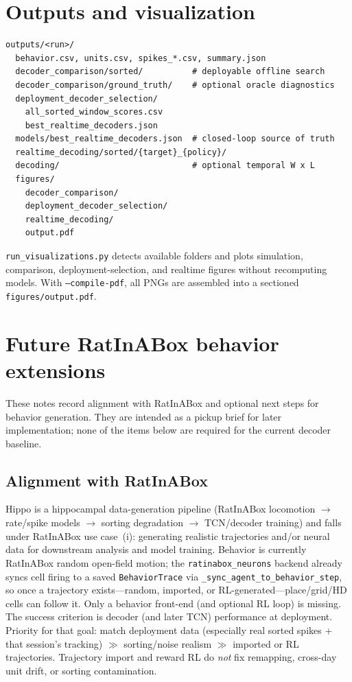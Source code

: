 \documentclass[11pt,a4paper]{article}
\begin{document}
\section{Outputs and visualization}

\begin{lstlisting}[caption={Experiment directory layout.}]
outputs/<run>/
  behavior.csv, units.csv, spikes_*.csv, summary.json
  decoder_comparison/sorted/          # deployable offline search
  decoder_comparison/ground_truth/    # optional oracle diagnostics
  deployment_decoder_selection/
    all_sorted_window_scores.csv
    best_realtime_decoders.json
  models/best_realtime_decoders.json  # closed-loop source of truth
  realtime_decoding/sorted/{target}_{policy}/
  decoding/                           # optional temporal W x L
  figures/
    decoder_comparison/
    deployment_decoder_selection/
    realtime_decoding/
    output.pdf
\end{lstlisting}

\texttt{run\_visualizations.py} detects available folders and plots simulation, comparison, deployment-selection, and realtime figures without recomputing models.
With \texttt{--compile-pdf}, all PNGs are assembled into a sectioned \texttt{figures/output.pdf}.

\section{Future RatInABox behavior extensions}

These notes record alignment with RatInABox and optional next steps for behavior generation.
They are intended as a pickup brief for later implementation; none of the items below are required for the current decoder baseline.

\subsection{Alignment with RatInABox}

Hippo is a hippocampal data-generation pipeline (RatInABox locomotion $\rightarrow$ rate/spike models $\rightarrow$ sorting degradation $\rightarrow$ TCN/decoder training) and falls under RatInABox use case~(i): generating realistic trajectories and/or neural data for downstream analysis and model training.
Behavior is currently RatInABox random open-field motion; the \texttt{ratinabox\_neurons} backend already syncs cell firing to a saved \texttt{BehaviorTrace} via \texttt{\_sync\_agent\_to\_behavior\_step}, so once a trajectory exists---random, imported, or RL-generated---place/grid/HD cells can follow it.
Only a behavior front-end (and optional RL loop) is missing.
The success criterion is decoder (and later TCN) performance at deployment.
Priority for that goal: match deployment data (especially real sorted spikes + that session's tracking) $\gg$ sorting/noise realism $\gg$ imported or RL trajectories.
Trajectory import and reward RL do \emph{not} fix remapping, cross-day unit drift, or sorting contamination.
\end{document}
